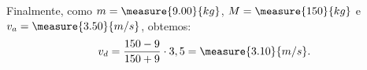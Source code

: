 \begin{question}
\begin{solution}
		Finalmente, como $m = \measure{9.00}{kg}$, $M = \measure{150}{kg}$ e $v_a = \measure{3.50}{m/s}$, obtemos:
		\begin{equation*}
			v_d = \frac{150 - 9}{150 + 9} \cdot 3,5 = \measure{3.10}{m/s}.
		\end{equation*}
	\end{solution}
\end{question}